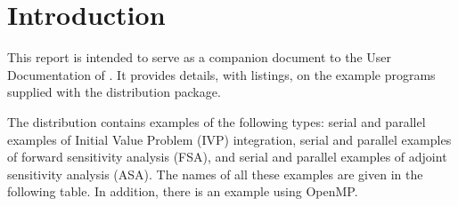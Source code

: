 \section{Introduction}\label{s:ex_intro}

This report is intended to serve as a companion document to the User
Documentation of {\cvodes} \cite{cvodes_ug}.  It provides details, with
listings, on the example programs supplied with the {\cvodes} distribution
package.

The {\cvodes} distribution contains examples of the following types: 
serial and parallel examples of Initial Value Problem (IVP) integration, 
serial and parallel examples of forward sensitivity analysis (FSA), and 
serial and parallel examples of adjoint sensitivity analysis (ASA).
The names of all these examples are given in the following table.
In addition, there is an example using OpenMP.

\newlength{\colone}

